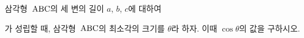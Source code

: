 삼각형~$\mathrm{ABC}$의 세 변의 길이 $a$, $b$, $c$에 대하여 \par\smallskip{}\par\smallskip\noindent 가 성립할 때, 삼각형~$\mathrm{ABC}$의 최소각의 크기를 $\theta$라 하자. 이때 $\cos\theta$의 값을 구하시오.
